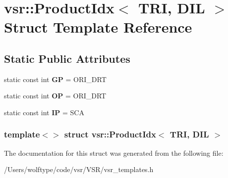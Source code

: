 \hypertarget{structvsr_1_1_product_idx_3_01_t_r_i_00_01_d_i_l_01_4}{\section{vsr\-:\-:Product\-Idx$<$ T\-R\-I, D\-I\-L $>$ Struct Template Reference}
\label{structvsr_1_1_product_idx_3_01_t_r_i_00_01_d_i_l_01_4}
}
\subsection*{Static Public Attributes}
\begin{DoxyCompactItemize}
\item 
\hypertarget{structvsr_1_1_product_idx_3_01_t_r_i_00_01_d_i_l_01_4_a67e9f568e3a0a03f63f67e6c4b4b4b8c}{static const int {\bfseries G\-P} = O\-R\-I\-\_\-\-D\-R\-T}\label{structvsr_1_1_product_idx_3_01_t_r_i_00_01_d_i_l_01_4_a67e9f568e3a0a03f63f67e6c4b4b4b8c}

\item 
\hypertarget{structvsr_1_1_product_idx_3_01_t_r_i_00_01_d_i_l_01_4_a62424719317a2ab428badc9ebdbbb76e}{static const int {\bfseries O\-P} = O\-R\-I\-\_\-\-D\-R\-T}\label{structvsr_1_1_product_idx_3_01_t_r_i_00_01_d_i_l_01_4_a62424719317a2ab428badc9ebdbbb76e}

\item 
\hypertarget{structvsr_1_1_product_idx_3_01_t_r_i_00_01_d_i_l_01_4_a5273c07be2676d7a608a781aba402b76}{static const int {\bfseries I\-P} = S\-C\-A}\label{structvsr_1_1_product_idx_3_01_t_r_i_00_01_d_i_l_01_4_a5273c07be2676d7a608a781aba402b76}

\end{DoxyCompactItemize}
\subsubsection*{template$<$$>$ struct vsr\-::\-Product\-Idx$<$ T\-R\-I, D\-I\-L $>$}



The documentation for this struct was generated from the following file\-:\begin{DoxyCompactItemize}
\item 
/\-Users/wolftype/code/vsr/\-V\-S\-R/vsr\-\_\-templates.\-h\end{DoxyCompactItemize}
